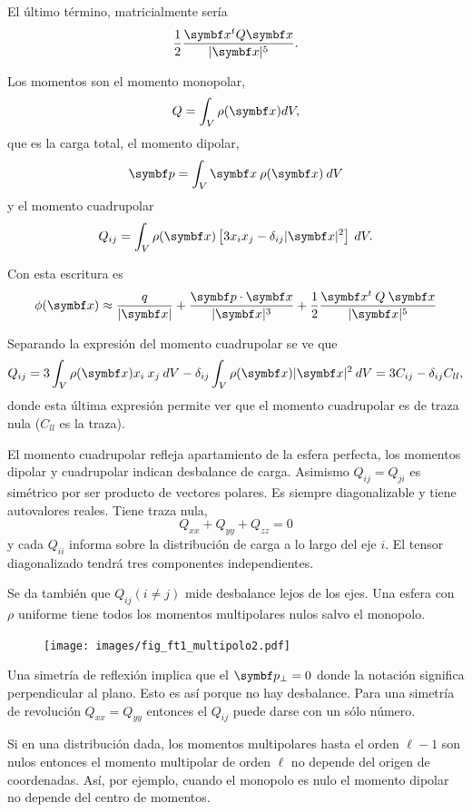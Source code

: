 \documentclass[10pt,oneside]{CBFT_book}
\begin{document}
El último término, matricialmente sería
\[
	\frac{1}{2} \frac{\vb{x}^t Q \vb{x}}{|\vb{x}|^5}.
\]

Los momentos son el momento monopolar,
\[
	Q = \int_V \rho(\vb{x}) dV, 
\]
que es la carga total, el momento dipolar,
\[
	\vb{p} = \int_V \vb{x} \: \rho(\vb{x}) \: dV
\]
y el momento cuadrupolar
\[
	Q_{ij} = \int_V  \rho(\vb{x}) \left[ 3 x_i x_j - \delta_{ij} |\vb{x}|^2 \right] \: dV.
\]

Con esta escritura es
\[
 	\phi(\vb{x}) \approx
	\frac{ q }{| \vbx |} + 
	\frac{ \pe{p}{x} }{| \vbx |^3} + 
	\frac{1}{2} \frac{\vb{x}^t \: Q \: \vb{x}}{|\vb{x}|^5}
\]

Separando la expresión del momento cuadrupolar se ve que
\[
	Q_{ij} = 
	3 \int_V  \rho(\vb{x}) x_i \: x_j  \: dV - \delta_{ij} \int_V  \rho(\vb{x})  |\vb{x}|^2  \: dV
	= 3 C_{ij} - \delta_{ij} C_{ll},
\]
donde esta última expresión permite ver que el momento cuadrupolar es de traza nula ($C_{ll}$ es la traza).

El momento cuadrupolar refleja apartamiento de la esfera perfecta, los momentos dipolar y cuadrupolar
indican desbalance de carga.
Asimismo $Q_{ij} = Q_{ji}$ es simétrico por ser producto de vectores polares.
Es siempre diagonalizable y tiene autovalores reales. 
Tiene traza nula,
\[
	Q_{xx} + Q_{yy} + Q_{zz}  = 0
\]
y cada $Q_{ii}$ informa sobre la distribución de carga a lo largo del eje $i$.
El tensor diagonalizado tendrá tres componentes independientes.


Se da también que $Q_{ij} (i\neq j)$ mide desbalance lejos de los ejes.
Una esfera con $\rho$ uniforme tiene todos los momentos multipolares nulos salvo el monopolo.

\begin{figure}[htb]
	\begin{center}
	\texttt{[image: images/fig\_ft1\_multipolo2.pdf]}	 
	\end{center}
	\caption{}
\end{figure}

Una simetría de reflexión implica que el $\vb{p}_\perp = 0$ donde la notación significa perpendicular
al plano. Esto es así porque no hay desbalance. Para una simetría de revolución $Q_{xx}=Q_{yy}$ entonces
el $Q_{ij}$ puede darse con un sólo número.

Si en una distribución dada, los momentos multipolares hasta el orden $\ell -1$ son nulos entonces
el momento multipolar de orden $\ell$ no depende del origen de coordenadas.
Así, por ejemplo, cuando el monopolo es nulo el momento dipolar no depende del centro de momentos.
\end{document}
